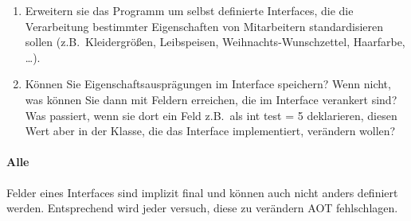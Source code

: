 \begin{enumerate}
    \item Erweitern sie das Programm um selbst definierte Interfaces, die die Verarbeitung bestimmter Eigenschaften von Mitarbeitern standardisieren sollen (z.B.\ Kleidergrößen, Leibspeisen, Weihnachts-Wunschzettel, Haarfarbe, \ldots).
    \item Können Sie Eigenschaftsausprägungen im Interface speichern?
    Wenn nicht, was können Sie dann mit Feldern erreichen, die im Interface verankert sind?
    Was passiert, wenn sie dort ein Feld z.B.\ als int test = 5 deklarieren, diesen Wert aber in der Klasse, die das Interface implementiert, verändern wollen?
\end{enumerate}

\paragraph{Alle} Felder eines Interfaces sind implizit final und können auch nicht anders definiert werden.
Entsprechend wird jeder versuch, diese zu verändern AOT fehlschlagen.